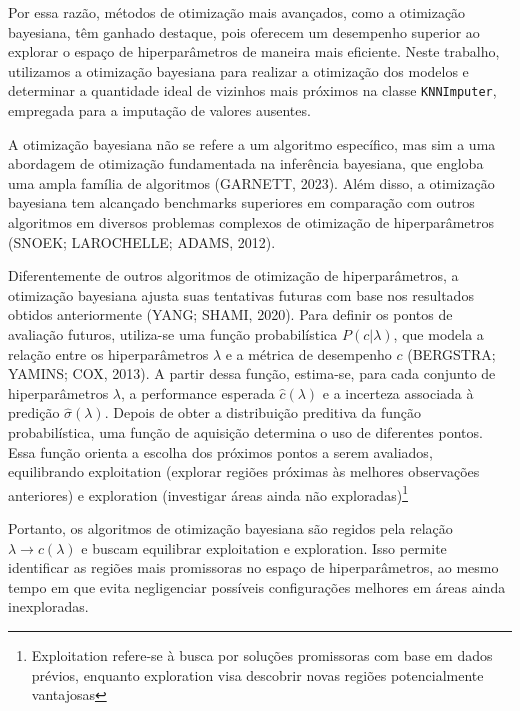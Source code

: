 \documentclass[
  12pt,
  a4paper,
]{scrreprt}
\begin{document}
\vspace{12pt}

Por essa razão, métodos de otimização mais avançados, como a otimização
bayesiana, têm ganhado destaque, pois oferecem um desempenho superior ao
explorar o espaço de hiperparâmetros de maneira mais eficiente. Neste
trabalho, utilizamos a otimização bayesiana para realizar a otimização
dos modelos e determinar a quantidade ideal de vizinhos mais próximos na
classe \texttt{KNNImputer}, empregada para a imputação de valores
ausentes.

\vspace{12pt}

A otimização bayesiana não se refere a um algoritmo específico, mas sim
a uma abordagem de otimização fundamentada na inferência bayesiana, que
engloba uma ampla família de algoritmos (GARNETT, 2023). Além disso, a
otimização bayesiana tem alcançado benchmarks superiores em comparação
com outros algoritmos em diversos problemas complexos de otimização de
hiperparâmetros (SNOEK; LAROCHELLE; ADAMS, 2012).

\vspace{12pt}

Diferentemente de outros algoritmos de otimização de hiperparâmetros, a
otimização bayesiana ajusta suas tentativas futuras com base nos
resultados obtidos anteriormente (YANG; SHAMI, 2020). Para definir os
pontos de avaliação futuros, utiliza-se uma função probabilística
\(P\left(c | \lambda \right)\), que modela a relação entre os
hiperparâmetros \(\lambda\) e a métrica de desempenho \(c\) (BERGSTRA;
YAMINS; COX, 2013). A partir dessa função, estima-se, para cada conjunto
de hiperparâmetros \(\lambda\), a performance esperada
\(\hat{c}\left(\lambda\right)\) e a incerteza associada à predição
\(\hat{\sigma}\left(\lambda\right)\). Depois de obter a distribuição
preditiva da função probabilística, uma função de aquisição determina o
uso de diferentes pontos. Essa função orienta a escolha dos próximos
pontos a serem avaliados, equilibrando exploitation (explorar regiões
próximas às melhores observações anteriores) e exploration (investigar
áreas ainda não exploradas)\footnote{Exploitation refere-se à busca por
  soluções promissoras com base em dados prévios, enquanto exploration
  visa descobrir novas regiões potencialmente vantajosas}

\vspace{12pt}

Portanto, os algoritmos de otimização bayesiana são regidos pela relação
\(\lambda \rightarrow c\left(\lambda \right)\) e buscam equilibrar
exploitation e exploration. Isso permite identificar as regiões mais
promissoras no espaço de hiperparâmetros, ao mesmo tempo em que evita
negligenciar possíveis configurações melhores em áreas ainda
inexploradas.
\end{document}
